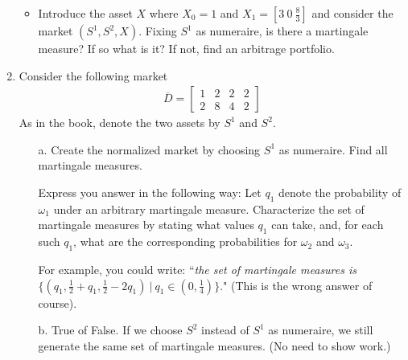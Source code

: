 \documentclass[12pt]{article}
\renewcommand{\o}{\omega}
\newcommand{\ol}{\overline}
\begin{document}
\begin{enumerate}
\begin{itemize}
    \item Introduce the asset $X$ where $X_0 = 1$ and $X_1 = [3\ 0\ \frac{8}{3}]$ and consider the market $(S^1, S^2, X)$. Fixing $S^1$ as numeraire, is there a martingale measure? If so what is it? If not, find an arbitrage portfolio.
  \end{itemize}
  \item Consider the following market
\begin{align*}
\ol{D} = \begin{bmatrix}
1	& 2	& 2	& 2\\
2	& 8	& 4	& 2
\end{bmatrix}
\end{align*}
As in the book, denote the two assets by $S^1$ and $S^2$.

\begin{itemize}
  \item[a.] Create the normalized market by choosing $S^1$ as numeraire. Find all martingale measures. 
  
  Express you answer in the following way: Let $q_1$ denote the probability of $\o_1$ under an arbitrary martingale measure. Characterize the set of martingale measures by stating what values $q_1$ can take, and, for each such $q_1$, what are the corresponding probabilities for $\o_2$ and $\o_3$.
  
  For example, you could write: ``\textit{the set of martingale measures is} $\{(q_1, \frac{1}{2} + q_1, \frac{1}{2} - 2 q_1)\ \vert\ q_1 \in (0, \frac{1}{4})\}$." (This is the wrong answer of course).

\begin{comment}  
  \textit{Solution}: The normalized market is
  \begin{align*}
  \ol{Z} = \begin{bmatrix}
  1	& 1	& 1	& 1\\
  2	& 4	& 2	& 1
  \end{bmatrix}
  \end{align*}
  Let $(q_1, q_2, q_3)$ be a martingale measure. The conditions on the $q$'s are: $q_i \in (0, 1)$ for all $i$, $1 = q_1 + q_2 + q_3$, and $2 = 4 q_1 + 2 q_2 + q_3$.
  
  This yields the condition $1 = 3 q_1 + q_2$ or, equivalently, $q_2 = 1 - 3 q_1$. Thus, the set of martingale measures is $\{(q_1, 1 - 3 q_1, 2 q_1)\ \vert\ q_1 \in (0, \frac{1}{3})\}$.
\end{comment}
  
  \item[b.] True of False. If we choose $S^2$ instead of $S^1$ as numeraire, we still generate the same set of martingale measures. (No need to show work.)
  

\end{itemize}
\end{enumerate}
\end{document}
